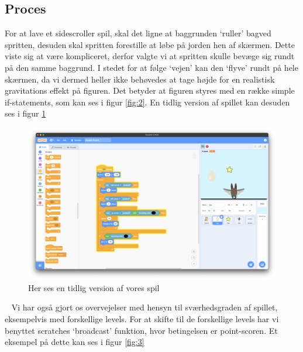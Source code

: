 \documentclass[12pt,a4paper]{article}
\begin{document}
\subsection{Proces}
For at lave et sidescroller spil, skal det ligne at baggrunden ‘ruller’ bagved spritten, desuden skal spritten forestille at løbe på jorden hen af skærmen. Dette viste sig at være kompliceret, derfor valgte vi at spritten skulle bevæge sig rundt på den samme baggrund. I stedet for at følge ‘vejen’ kan den ‘flyve’ rundt på hele skærmen, da vi dermed heller ikke behøvedes at tage højde for en realistisk gravitations effekt på figuren. Det betyder at figuren styres med en række simple if-statements, som kan ses i figur \ref{fig:2}. En tidlig version af spillet kan desuden ses i figur \ref{fig:5}\\
\begin{figure}[h]
    \centering
    \includegraphics[width=\linewidth]{Tidlig version.png}
    \caption{Her ses en tidlig version af vores spil}
    \label{fig:5}
\end{figure}
\
\linebreak
Vi har også gjort os overvejelser med hensyn til sværhedsgraden af spillet, eksempelvis med forskellige levels.  For at skifte til de forskellige levels har vi benyttet scratches ‘broadcast’ funktion, hvor betingelsen er point-scoren. Et eksempel på dette kan ses i figur \ref{fig:3}
\end{document}
